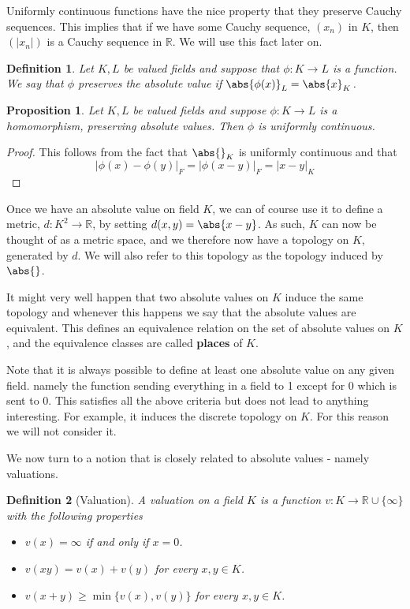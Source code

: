 \documentclass{article}
\newtheorem{definition}{Definition}[section]
\newtheorem{proposition}{Proposition}[section]
\newcommand{\mbb}[1]{\mathbb{#1}}
\begin{document}
Uniformly continuous functions have the nice property that they preserve Cauchy sequences. This implies that if we have some Cauchy sequence, $(x_n)$ in $K$, then $(|x_n|)$ is a Cauchy sequence in $\mbb R$. We will use this fact later on.

\begin{definition}
    Let $K, L$ be valued fields and suppose that $\phi : K \to L$ is a function. We say that $\phi$ preserves the absolute value if $\abs{\phi(x)}_L = \abs{x}_K$.
\end{definition}

\begin{proposition}
    Let $K,L$ be valued fields and suppose $\phi : K \to L$ is a homomorphism, preserving absolute values. Then $\phi$ is uniformly continuous.
\end{proposition}

\begin{proof}
    This follows from the fact that $\abs{}_K$ is uniformly continuous and that
    $$|\phi(x) - \phi(y)|_F = |\phi(x-y)|_F = |x-y|_K$$ 
\end{proof}

Once we have an absolute value on field $K$, we can of course use it to define a metric, $d : K^2 \to \mbb R$, by setting $d(x,y) = \abs{x - y}$. As such, $K$ can now be thought of as a metric space, and we therefore now have a topology on $K$, generated by $d$. We will also refer to this topology as the topology induced by $\abs{}$.


It might very well happen that two absolute values on $K$ induce the same topology and whenever this happens we say that the absolute values are equivalent. This defines an equivalence relation on the set of absolute values on $K$, and the equivalence classes are called \textbf{places} of $K$. 

Note that it is always possible to define at least one absolute value on any given field. namely the function sending everything in a field to 1 except for 0 which is sent to 0. This satisfies all the above criteria but does not lead to anything interesting. For example, it induces the discrete topology on $K$. For this reason we will not consider it. 

We now turn to a notion that is closely related to absolute values - namely valuations. 

\begin{definition}[Valuation]
    A valuation on a field $K$ is a function $v : K \to \mbb R \cup \{\infty\}$ with the following properties 
    \begin{itemize}
        \item $v(x) = \infty$ if and only if $x = 0$.
        \item $v(xy) = v(x) + v(y)$ for every $x,y \in K$. 
        \item $v(x + y) \geq \min \{v(x), v(y)\}$ for every $x,y \in K$.
    \end{itemize}
\end{definition}
\end{document}
